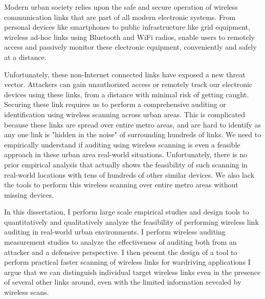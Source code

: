\begin{dissertationabstract}
    Modern urban society relies upon the safe and secure operation of wireless communication links that are part of all modern electronic systems. 
    From personal devices like smartphones to public infrastructure like grid equipment, wireless ad-hoc links using Bluetooth and WiFi radios, enable users to remotely access and passively monitor these electronic equipment, conveniently and safely at a distance.
    
    Unfortunately, these non-Internet connected links have exposed a new threat vector.
    Attackers can gain unauthorized access or remotely track our electronic devices using these links, from a distance with minimal risk of getting caught.
    Securing these link requires us to perform a comprehensive auditing or identification using wireless scanning across urban areas.
    This is complicated because these links are spread over entire metro areas, and are hard to identify as any one link is "hidden in the noise" of surrounding hundreds of links.
    We need to empirically understand if auditing using wireless scanning is even a feasible approach in these urban area real-world situations.
    Unfortunately, there is no prior empirical analysis that actually shows the feasibility of such scanning in real-world locations with tens of hundreds of other similar devices.
    We also lack the tools to perform this wireless scanning over entire metro areas without missing devices.

    In this dissertation, I perform large scale empirical studies and design tools to quantitatively and qualitatively analyze the feasibility of performing wireless link auditing in real-world urban environments.
%
I perform wireless auditing measurement studies to analyze the effectiveness of auditing both from an attacker and a defensive perspective.
%
I then present the design of a tool to perform practical faster scanning of wireless links for wardriving applications
%
I argue that we can distinguish individual target wireless links even in the presence of several other links around, even with the limited information revealed by wireless scans.


\end{dissertationabstract}